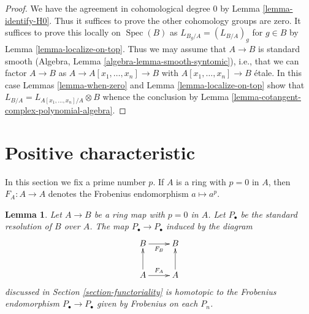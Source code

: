 \documentclass{stacks-project}
\theoremstyle{plain}
\newtheorem{lemma}[subsection]{Lemma}
\theoremstyle{definition}
\theoremstyle{remark}
\numberwithin{equation}{subsection}
\def\Spec{\mathop{\mathrm{Spec}}}
\begin{document}
\begin{proof}
We have the agreement in cohomological degree $0$ by
Lemma \ref{lemma-identify-H0}.
Thus it suffices to prove the other cohomology groups
are zero. It suffices to prove this locally on $\Spec(B)$ as
$L_{B_g/A} = (L_{B/A})_g$ for $g \in B$ by Lemma \ref{lemma-localize-on-top}.
Thus we may assume that $A \to B$ is standard smooth
(Algebra, Lemma \ref{algebra-lemma-smooth-syntomic}), i.e.,
that we can factor $A \to B$ as
$A \to A[x_1, \ldots, x_n] \to B$ with $A[x_1, \ldots, x_n] \to B$
\'etale. In this case Lemmas \ref{lemma-when-zero} and
Lemma \ref{lemma-localize-on-top} show that
$L_{B/A} = L_{A[x_1, \ldots, x_n]/A} \otimes B$
whence the conclusion by
Lemma \ref{lemma-cotangent-complex-polynomial-algebra}.
\end{proof}





\section{Positive characteristic}
\label{section-positive-characteristic}

\noindent
In this section we fix a prime number $p$.
If $A$ is a ring with $p = 0$ in $A$, then $F_A : A \to A$
denotes the Frobenius endomorphism $a \mapsto a^p$.

\begin{lemma}
\label{lemma-frobenius-homotopy}
Let $A \to B$ be a ring map with $p = 0$ in $A$. Let $P_\bullet$ be the
standard resolution of $B$ over $A$. The map $P_\bullet \to P_\bullet$
induced by the diagram
$$
\xymatrix{
B \ar[r]_{F_B} & B \\
A \ar[u] \ar[r]^{F_A} & A \ar[u]
}
$$
discussed in Section \ref{section-functoriality} is homotopic to the Frobenius
endomorphism $P_\bullet \to P_\bullet$ given by Frobenius on each $P_n$.
\end{lemma}
\end{document}
